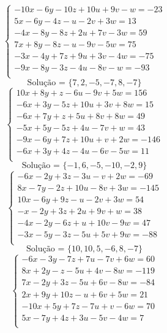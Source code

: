 \documentclass[12pt,oneside,a4paper]{article}
\begin{document}
\vspace{\baselineskip}
\begin{equation*}
\begin{cases}
-10x-6y-10z+10u+9v-w=-23 \\
5x-6y-4z-u-2v+3w=13 \\
-4x-8y-8z+2u+7v-3w=59 \\
7x+8y-8z-u-9v-5w=75 \\
-3x-4y+7z+9u+3v-4w=-75 \\
-9x-8y-3z-4u-8v-w=-93 \\
\end{cases}
\end{equation*}
\begin{equation*}
\text{Solução = }\{7,2,-5,-7,8,-7\}
\end{equation*}
\vspace{\baselineskip}
\begin{equation*}
\begin{cases}
10x+8y+z-6u-9v+5w=156 \\
-6x+3y-5z+10u+3v+8w=15 \\
-6x+7y+z+5u+8v+8w=49 \\
-5x+5y-5z+4u-7v+w=43 \\
-9x-6y+7z+10u+v+2w=-146 \\
-6x+3y+4z-4u-6v-5w=11 \\
\end{cases}
\end{equation*}
\begin{equation*}
\text{Solução = }\{-1,6,-5,-10,-2,9\}
\end{equation*}
\vspace{\baselineskip}
\begin{equation*}
\begin{cases}
-6x-2y+3z-3u-v+2w=-69 \\
8x-7y-2z+10u-8v+3w=-145 \\
10x-6y+9z-u-2v+3w=54 \\
-x-2y+3z+2u+9v+w=38 \\
-4x-2y-6z+u+10v-9w=47 \\
-3x-5y-3z-5u+5v+9w=-88 \\
\end{cases}
\end{equation*}
\begin{equation*}
\text{Solução = }\{10,10,5,-6,8,-7\}
\end{equation*}
\vspace{\baselineskip}
\begin{equation*}
\begin{cases}
-6x-3y-7z+7u-7v+6w=60 \\
8x+2y-z-5u+4v-8w=-119 \\
7x-2y+3z-5u+6v-8w=-84 \\
2x+9y+10z-u+6v+5w=21 \\
-10x+5y+7z-7u+v-6w=70 \\
5x-7y+4z+3u-5v-4w=7 \\
\end{cases}
\end{equation*}
\end{document}
